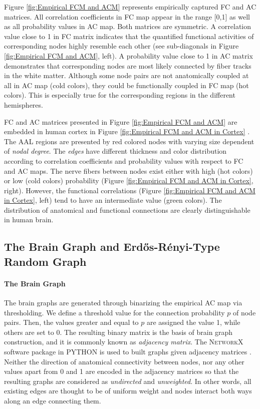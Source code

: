 \documentclass[fleqn,10pt]{wlpeerj}
\begin{document}
Figure \ref{fig:Empirical FCM and ACM} represents empirically captured FC and AC matrices. All correlation coefficients in FC map appear in the range [0,1] as well as all probability values in AC map. Both matrices are symmetric. A correlation value close to 1 in FC matrix indicates that the quantified functional activities of corresponding nodes highly resemble each other (see sub-diagonals in Figure \ref{fig:Empirical FCM and ACM}, left). A probability value close to 1 in AC matrix demonstrates that corresponding nodes are most likely connected by fiber tracks in the white matter. Although some node pairs are not anatomically coupled at all in AC map (cold colors), they could be functionally coupled in FC map (hot colors). This is especially true for the corresponding regions in the different hemispheres.    

FC and AC matrices presented in Figure \ref{fig:Empirical FCM and ACM} are embedded in human cortex in Figure \ref{fig:Empirical FCM and ACM in Cortex} \citep{XYZ13}. The AAL regions are presented by red colored nodes with varying size dependent of \textit{nodal degree}. The \textit{edges} have different thickness and color distribution according to correlation coefficients and probability values with respect to FC and AC maps. The nerve fibers between nodes exist either with high (hot colors) or low (cold colors) probability (Figure \ref{fig:Empirical FCM and ACM in Cortex}, right). However, the functional correlations (Figure \ref{fig:Empirical FCM and ACM in Cortex}, left) tend to have an intermediate value (green colors). The distribution of anatomical and functional connections are clearly distinguishable in human brain.   



\subsection*{The Brain Graph and Erd\H{o}s-R\'{e}nyi-Type Random Graph}

\paragraph{The Brain Graph}

The brain graphs are generated through binarizing the empirical AC map via thresholding. We define a threshold value for the connection probability $p$ of node pairs. Then, the values greater and equal to $p$ are assigned the value 1, while others are set to 0. The resulting binary matrix is the basis of brain graph construction, and it is commonly known as \textit{adjacency matrix}. The \textsc{NetworkX} software package in \textsc{PYTHON} is used to built graphs given adjacency matrices \citep{XYZNETW}. Neither the direction of anatomical connectivity between nodes, nor any other values apart from 0 and 1  are encoded in the adjacency matrices so that the resulting graphs are considered as \textit{undirected} and \textit{unweighted}. In other words, all existing edges are thought to be of uniform weight and nodes interact both ways along an edge connecting them.
\end{document}
